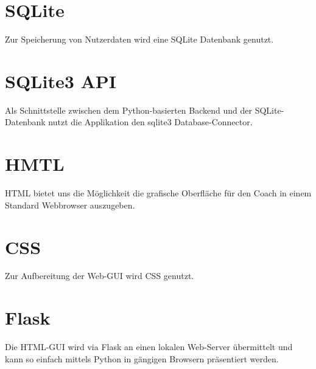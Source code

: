     \section{SQLite}
        Zur Speicherung von Nutzerdaten wird eine SQLite Datenbank \cite{sqlite} genutzt.


    \section{SQLite3 API}
        Als Schnittstelle zwischen dem Python-basierten Backend und der SQLite-Datenbank nutzt die Applikation den sqlite3 Database-Connector. \cite{sqlite3API}



    \section{HMTL}
        HTML bietet uns die Möglichkeit die grafische Oberfläche für den Coach in einem Standard Webbrowser auszugeben. \cite{HTML}


    \section{CSS}
        Zur Aufbereitung der Web-GUI wird CSS genutzt.


    \section{Flask}
        Die HTML-GUI wird via Flask \cite{flask} an einen lokalen Web-Server übermittelt und kann so einfach mittels Python in gängigen Browsern präsentiert werden.


